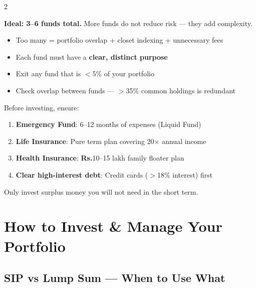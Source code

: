 \documentclass[11pt,a4paper]{article}
\newcommand{\rupee}{\textbf{\textsf{Rs.}}}
\begin{document}
\newpage
\begin{multicols}{2}
\begin{tipbox}[title=How Many Funds Is Enough?]
\textbf{Ideal: 3--6 funds total.}  More funds do not reduce risk --- they add complexity.
\begin{itemize}
  \item Too many = portfolio overlap + closet indexing + unnecessary fees
  \item Each fund must have a \textbf{clear, distinct purpose}
  \item Exit any fund that is $<$5\% of your portfolio
  \item Check overlap between funds --- $>$35\% common holdings is redundant
\end{itemize}
\end{tipbox}

\columnbreak

\begin{tipbox}[title=Financial Safety Net First]
Before investing, ensure:
\begin{enumerate}
  \item \textbf{Emergency Fund}: 6--12 months of expenses (Liquid Fund)
  \item \textbf{Life Insurance}: Pure term plan covering 20$\times$ annual income
  \item \textbf{Health Insurance}: \rupee{}10--15 lakh family floater plan
  \item \textbf{Clear high-interest debt}: Credit cards ($>$18\% interest) first
\end{enumerate}
Only invest surplus money you will not need in the short term.
\end{tipbox}
\end{multicols}

\section{How to Invest \& Manage Your Portfolio}

\subsection{SIP vs Lump Sum --- When to Use What}
\end{document}
